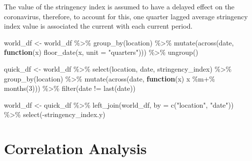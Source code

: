 \documentclass[11pt,preprint, authoryear]{elsarticle}
\numberwithin{equation}{section}
\numberwithin{figure}{section}
\numberwithin{table}{section}
\newenvironment{Shaded}{\begin{snugshade}}{\end{snugshade}}
\newcommand{\AttributeTok}[1]{\textcolor[rgb]{0.77,0.63,0.00}{#1}}
\newcommand{\ControlFlowTok}[1]{\textcolor[rgb]{0.13,0.29,0.53}{\textbf{#1}}}
\newcommand{\DecValTok}[1]{\textcolor[rgb]{0.00,0.00,0.81}{#1}}
\newcommand{\FunctionTok}[1]{\textcolor[rgb]{0.00,0.00,0.00}{#1}}
\newcommand{\NormalTok}[1]{#1}
\newcommand{\OtherTok}[1]{\textcolor[rgb]{0.56,0.35,0.01}{#1}}
\newcommand{\SpecialCharTok}[1]{\textcolor[rgb]{0.00,0.00,0.00}{#1}}
\newcommand{\StringTok}[1]{\textcolor[rgb]{0.31,0.60,0.02}{#1}}
\begin{document}
The value of the stringency index is assumed to have a delayed effect on
the coronavirus, therefore, to account for this, one quarter lagged
average stringency index value is associated the current with each
current period.

\begin{Shaded}
\begin{Highlighting}[]
\NormalTok{world\_df }\OtherTok{\textless{}{-}}\NormalTok{ world\_df }\SpecialCharTok{\%\textgreater{}\%}
    \FunctionTok{group\_by}\NormalTok{(location) }\SpecialCharTok{\%\textgreater{}\%}
    \FunctionTok{mutate}\NormalTok{(}\FunctionTok{across}\NormalTok{(date, }\ControlFlowTok{function}\NormalTok{(x) }\FunctionTok{floor\_date}\NormalTok{(x, }\AttributeTok{unit =} \StringTok{"quarters"}\NormalTok{))) }\SpecialCharTok{\%\textgreater{}\%} 
    \FunctionTok{ungroup}\NormalTok{()}
    
\NormalTok{quick\_df }\OtherTok{\textless{}{-}}\NormalTok{ world\_df }\SpecialCharTok{\%\textgreater{}\%}
    \FunctionTok{select}\NormalTok{(location, date, stringency\_index) }\SpecialCharTok{\%\textgreater{}\%} 
    \FunctionTok{group\_by}\NormalTok{(location) }\SpecialCharTok{\%\textgreater{}\%} 
    \FunctionTok{mutate}\NormalTok{(}\FunctionTok{across}\NormalTok{(date, }\ControlFlowTok{function}\NormalTok{(x) x }\SpecialCharTok{\%m+\%} \FunctionTok{months}\NormalTok{(}\DecValTok{3}\NormalTok{))) }\SpecialCharTok{\%\textgreater{}\%} 
    \FunctionTok{filter}\NormalTok{(date }\SpecialCharTok{!=} \FunctionTok{last}\NormalTok{(date))}

\NormalTok{world\_df }\OtherTok{\textless{}{-}}\NormalTok{ quick\_df }\SpecialCharTok{\%\textgreater{}\%} \FunctionTok{left\_join}\NormalTok{(world\_df, }\AttributeTok{by =} \FunctionTok{c}\NormalTok{(}\StringTok{"location"}\NormalTok{, }\StringTok{"date"}\NormalTok{)) }\SpecialCharTok{\%\textgreater{}\%} 
    \FunctionTok{select}\NormalTok{(}\SpecialCharTok{{-}}\NormalTok{stringency\_index.y)}
\end{Highlighting}
\end{Shaded}

\hypertarget{correlation-analysis}{%
\section{Correlation Analysis}\label{correlation-analysis}}
\end{document}
